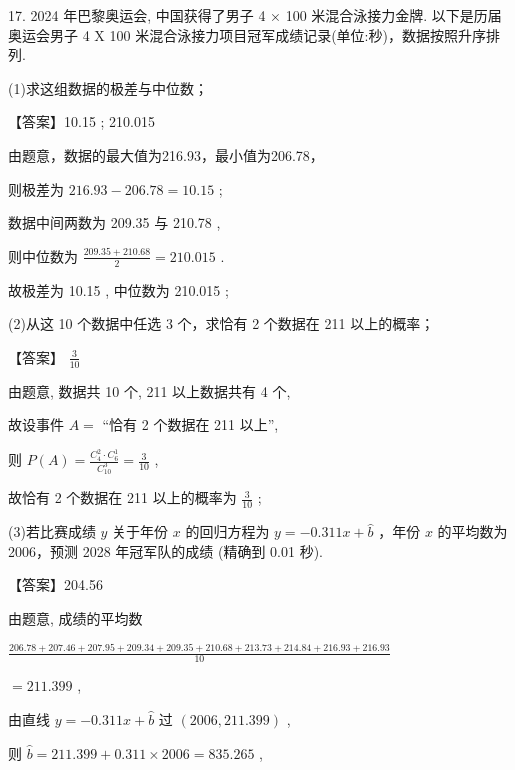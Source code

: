 \documentclass[10pt]{article}
\begin{document}
17. 2024 年巴黎奥运会, 中国获得了男子 4 × 100 米混合泳接力金牌. 以下是历届奥运会男子 4 X 100 米混合泳接力项目冠军成绩记录(单位:秒)，数据按照升序排列.

\begin{center}
\end{center}

(1)求这组数据的极差与中位数；

【答案】10.15 ; 210.015

由题意，数据的最大值为216.93，最小值为206.78，

则极差为 \({216.93} - {206.78} = {10.15}\) ;

数据中间两数为 209.35 与 210.78 ,

则中位数为 \(\frac{{209.35} + {210.68}}{2} = {210.015}\) .

故极差为 10.15 , 中位数为 210.015 ;

(2)从这 10 个数据中任选 3 个，求恰有 2 个数据在 211 以上的概率；

【答案】 \(\frac{3}{10}\)

由题意, 数据共 10 个, 211 以上数据共有 4 个,

故设事件 \(A =\) “恰有 2 个数据在 211 以上”,

则 \(P\left( A\right)  = \frac{{C}_{4}^{2} \cdot  {C}_{6}^{1}}{{C}_{10}^{3}} = \frac{3}{10}\) ,

故恰有 2 个数据在 211 以上的概率为 \(\frac{3}{10}\) ;

(3)若比赛成绩 \(y\) 关于年份 \(x\) 的回归方程为 \(y =  - {0.311x} + \widehat{b}\) ，年份 \(x\) 的平均数为 2006，预测 2028 年冠军队的成绩 (精确到 0.01 秒).

【答案】204.56

由题意, 成绩的平均数

\(\frac{{206.78} + {207.46} + {207.95} + {209.34} + {209.35} + {210.68} + {213.73} + {214.84} + {216.93} + {216.93}}{10}\)

\(= {211.399}\) ,

由直线 \(y =  - {0.311x} + \widehat{b}\) 过 \(\left( {{2006},{211.399}}\right)\) ,

则 \(\widehat{b} = {211.399} + {0.311} \times  {2006} = {835.265}\) ,
\end{document}
